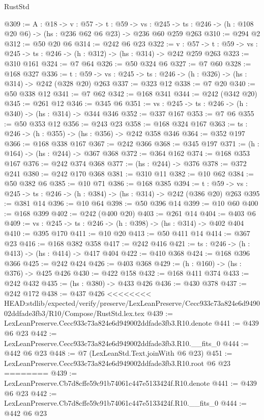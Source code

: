 \begin{lexlean}{RustStd}
\begin{coremodule}
{\begin{coremodule}
@309 := {A : @18} ->
  {v : @57} ->
  {t : @59} ->
  {vs : @245} -> {ts : @246} -> (h : @108 @20 @6) -> (hs : @236 @62 @6 @23) -> @236 @60 @259 @263
@310 := @294 @2
@312 := @50 @20 @6
@314 := @242 @6 @23
@322 := {v : @57} ->
  {t : @59} -> {vs : @245} -> {ts : @246} -> (h : @312) -> (hs : @314) -> @242 @259 @263
@323 := @310 @161
@324 := @7 @64
@326 := @50 @324 @6
@327 := @7 @60
@328 := @168 @327
@336 := {t : @59} -> {vs : @245} -> {ts : @246} -> (h : @326) -> (hs : @314) -> @242 (@328 @20) @263
@337 := @323 @12
@338 := @7 @20
@340 := @50 @338 @12
@341 := @7 @62
@342 := @168 @341
@344 := @242 (@342 @20)
@345 := @261 @12
@346 := @345 @6
@351 := {vs : @245} -> {ts : @246} -> (h : @340) -> (hs : @314) -> @344 @346
@352 := @337 @167
@353 := @7 @6
@355 := @50 @353 @12
@356 := @243 @23
@358 := @168 @324 @167
@363 := {ts : @246} -> (h : @355) -> (hs : @356) -> @242 @358 @346
@364 := @352 @197
@366 := @168 @338 @167
@367 := @242 @366
@368 := @345 @197
@371 := (h : @164) -> (hs : @244) -> @367 @368
@372 := @364 @162
@374 := @168 @353 @167
@376 := @242 @374 @368
@377 := (hs : @244) -> @376
@378 := @372 @241
@380 := @242 @170 @368
@381 := @310 @11
@382 := @10 @62
@384 := @50 @382 @6
@385 := @10 @71
@386 := @168 @385
@394 := {t : @59} -> {vs : @245} -> {ts : @246} -> (h : @384) -> (hs : @314) -> @242 (@386 @20) @263
@395 := @381 @14
@396 := @10 @64
@398 := @50 @396 @14
@399 := @10 @60
@400 := @168 @399
@402 := @242 (@400 @20)
@403 := @261 @14
@404 := @403 @6
@409 := {vs : @245} -> {ts : @246} -> (h : @398) -> (hs : @314) -> @402 @404
@410 := @395 @170
@411 := @10 @20
@413 := @50 @411 @14
@414 := @367 @23
@416 := @168 @382 @358
@417 := @242 @416
@421 := {ts : @246} -> (h : @413) -> (hs : @414) -> @417 @404
@422 := @410 @368
@424 := @168 @396 @366
@425 := @242 @424
@426 := @403 @368
@429 := (h : @160) -> (hs : @376) -> @425 @426
@430 := @422 @158
@432 := @168 @411 @374
@433 := @242 @432
@435 := (hs : @380) -> @433 @426
@436 := @430 @378
@437 := @242 @172
@438 := @437 @426
<<<<<<<< HEAD:stdlib/expected/verify/preserve/LexLeanPreserve/Cecc933c73a824e6d949002ddfade3fb3/R10/Compose/RustStd.lex.tex
@439 := LexLeanPreserve.Cecc933c73a824e6d949002ddfade3fb3.R10.denote
@441 := @439 @6 @23
@442 := LexLeanPreserve.Cecc933c73a824e6d949002ddfade3fb3.R10.__fits_0
@444 := @442 @6 @23
@448 := @7 (LexLeanStd.Text.joinWith @6 @23)
@451 := LexLeanPreserve.Cecc933c73a824e6d949002ddfade3fb3.R10.root @6 @23
========
@439 := LexLeanPreserve.Cb7d8cffe59c91b74061c447e5133424f.R10.denote
@441 := @439 @6 @23
@442 := LexLeanPreserve.Cb7d8cffe59c91b74061c447e5133424f.R10.__fits_0
@444 := @442 @6 @23

\end{coremodule}}
\end{coremodule}
\end{lexlean}
